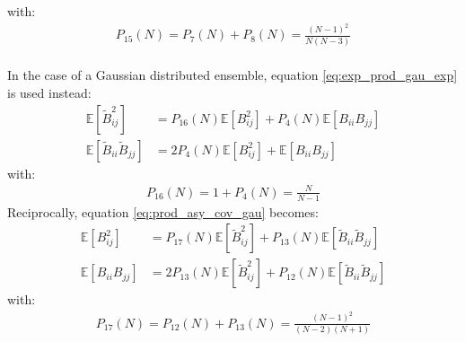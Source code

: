 \documentclass[12pt]{scrartcl}
\begin{document}
with:
\begin{align}
P_{15}(N) = P_7(N) + P_8(N) =  \frac{(N-1)^2}{N(N-3)}
\end{align}
$  $\\
In the case of a Gaussian distributed ensemble, equation \eqref{eq:exp_prod_gau_exp} is used instead:
\begin{subequations}
\begin{align}
\label{eq:exp_prod_gau_exp_2}
\mathbb{E} \left[\widetilde{B}_{ij}^2\right] & = P_{16}(N) \mathbb{E} \left[B^2_{ij}\right] + P_4(N) \mathbb{E} \left[B_{ii} B_{jj}\right] \\
\label{eq:exp_prod_gau_exp_3}
\mathbb{E} \left[\widetilde{B}_{ii} \widetilde{B}_{jj}\right] & = 2 P_4(N) \mathbb{E} \left[B^2_{ij}\right] + \mathbb{E} \left[B_{ii} B_{jj}\right]
\end{align}
\end{subequations}
with:
\begin{align}
P_{16}(N) = 1 + P_4(N) = \frac{N}{N-1}
\end{align}
Reciprocally, equation \eqref{eq:prod_asy_cov_gau} becomes:
\begin{subequations}
\begin{align}
\label{eq:prod_asy_cov_gau_exp_2}
\mathbb{E} \left[B^2_{ij}\right] & = P_{17}(N) \mathbb{E} \left[ \widetilde{B}_{ij}^2 \right] + P_{13}(N) \mathbb{E} \left[\widetilde{B}_{ii} \widetilde{B}_{jj} \right] \\
\label{eq:prod_asy_cov_gau_exp_3}
\mathbb{E} \left[B_{ii} B_{jj}\right] & = 2 P_{13}(N) \mathbb{E} \left[\widetilde{B}_{ij}^2\right] + P_{12}(N) \mathbb{E} \left[\widetilde{B}_{ii} \widetilde{B}_{jj}\right]
\end{align}
\end{subequations}
with:
\begin{align}
P_{17}(N) = P_{12}(N) + P_{13}(N) = \frac{(N-1)^2}{(N-2)(N+1)}
\end{align}
\end{document}
